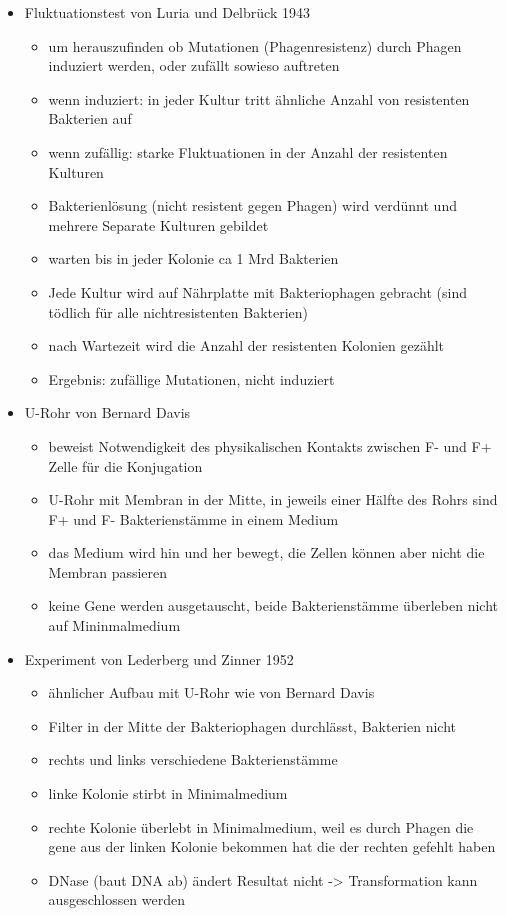 \documentclass{article}
\begin{document}
\begin{itemize}
    \item Fluktuationstest von Luria und Delbrück 1943
        \begin{itemize}
            \item um herauszufinden ob Mutationen (Phagenresistenz) durch Phagen induziert werden, oder zufällt sowieso auftreten 
            \item wenn induziert: in jeder Kultur tritt ähnliche Anzahl von resistenten Bakterien auf
            \item wenn zufällig: starke Fluktuationen in der Anzahl der resistenten Kulturen
            \item Bakterienlösung (nicht resistent gegen Phagen) wird verdünnt und mehrere Separate Kulturen gebildet
            \item warten bis in jeder Kolonie ca 1 Mrd Bakterien
            \item Jede Kultur wird auf Nährplatte mit Bakteriophagen gebracht (sind tödlich für alle nichtresistenten Bakterien)
            \item nach Wartezeit wird die Anzahl der resistenten Kolonien gezählt
            \item Ergebnis: zufällige Mutationen, nicht induziert
        \end{itemize}        
        
    \item U-Rohr von Bernard Davis
        \begin{itemize}
            \item beweist Notwendigkeit des physikalischen Kontakts zwischen F- und F+ Zelle für die Konjugation
            \item U-Rohr mit Membran in der Mitte, in jeweils einer Hälfte des Rohrs sind F+ und F- Bakterienstämme in einem Medium
            \item das Medium wird hin und her bewegt, die Zellen können aber nicht die Membran passieren
            \item keine Gene werden ausgetauscht, beide Bakterienstämme überleben nicht auf Mininmalmedium
        \end{itemize}        
        
    \item Experiment von Lederberg und Zinner 1952
        \begin{itemize}
            \item ähnlicher Aufbau mit U-Rohr wie von Bernard Davis
            \item Filter in der Mitte der Bakteriophagen durchlässt, Bakterien nicht
            \item rechts und links verschiedene Bakterienstämme
            \item linke Kolonie stirbt in Minimalmedium
            \item rechte Kolonie überlebt in Minimalmedium, weil es durch Phagen die gene aus der linken Kolonie bekommen hat die der rechten gefehlt haben
            \item DNase (baut DNA ab) ändert Resultat nicht -> Transformation kann ausgeschlossen werden
        \end{itemize}  
        

\end{itemize}
\end{document}
